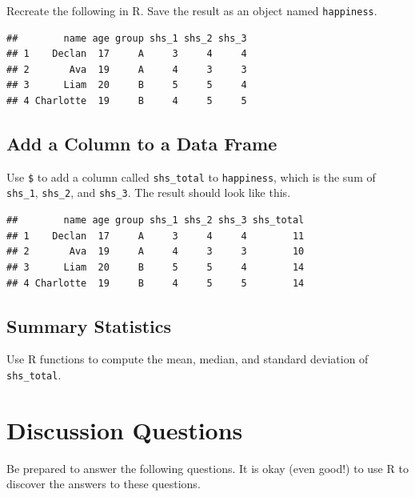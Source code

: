 \documentclass[
]{book}
\begin{document}
Recreate the following in R. Save the result as an object named \texttt{happiness}.

\begin{verbatim}
##        name age group shs_1 shs_2 shs_3
## 1    Declan  17     A     3     4     4
## 2       Ava  19     A     4     3     3
## 3      Liam  20     B     5     5     4
## 4 Charlotte  19     B     4     5     5
\end{verbatim}

\hypertarget{add-a-column-to-a-data-frame}{%
\subsection{Add a Column to a Data Frame}\label{add-a-column-to-a-data-frame}}

Use \texttt{\$} to add a column called \texttt{shs\_total} to \texttt{happiness}, which is the sum of \texttt{shs\_1}, \texttt{shs\_2}, and \texttt{shs\_3}. The result should look like this.

\begin{verbatim}
##        name age group shs_1 shs_2 shs_3 shs_total
## 1    Declan  17     A     3     4     4        11
## 2       Ava  19     A     4     3     3        10
## 3      Liam  20     B     5     5     4        14
## 4 Charlotte  19     B     4     5     5        14
\end{verbatim}

\hypertarget{summary-statistics}{%
\subsection{Summary Statistics}\label{summary-statistics}}

Use R functions to compute the mean, median, and standard deviation of \texttt{shs\_total}.

\hypertarget{discussion-questions}{%
\section{Discussion Questions}\label{discussion-questions}}

Be prepared to answer the following questions. It is okay (even good!) to use R to discover the answers to these questions.
\end{document}

